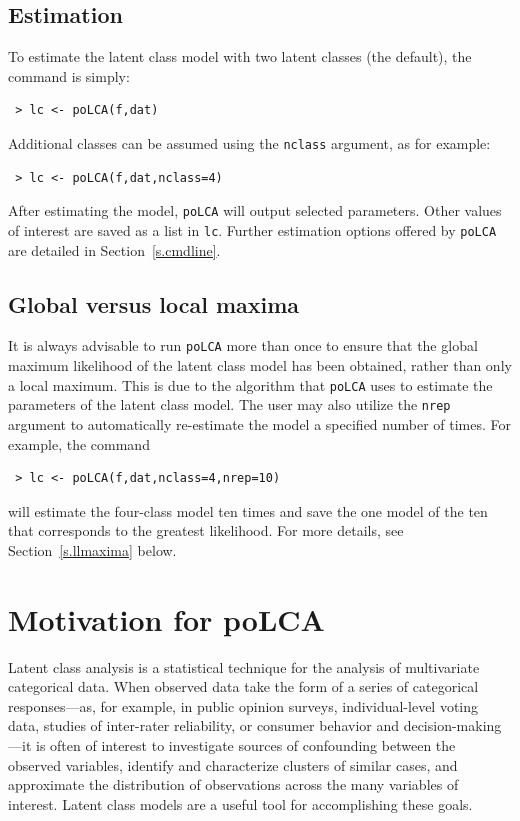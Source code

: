 \documentclass[letterpaper,12pt]{article}
\begin{document}
\subsection{Estimation}

To estimate the latent class model with two latent classes (the default), the command is simply:
\begin{verbatim}
 > lc <- poLCA(f,dat)
\end{verbatim}
Additional classes can be assumed using the \texttt{nclass} argument, as for example:
\begin{verbatim}
 > lc <- poLCA(f,dat,nclass=4)
\end{verbatim}
After estimating the model, \texttt{poLCA} will output selected parameters. Other values of interest are saved as a list in \texttt{lc}.  Further estimation options offered by \texttt{poLCA} are detailed in Section~\ref{s.cmdline}.

\subsection{Global versus local maxima}

It is always advisable to run \texttt{poLCA} more than once to ensure that the global maximum likelihood of the latent class model has been obtained, rather than only a local maximum. This is due to the algorithm that \texttt{poLCA} uses to estimate the parameters of the latent class model. The user may also utilize the \texttt{nrep} argument to automatically re-estimate the model a specified number of times.  For example, the command
\begin{verbatim}
 > lc <- poLCA(f,dat,nclass=4,nrep=10)
\end{verbatim}
will estimate the four-class model ten times and save the one model of the ten that corresponds to the greatest likelihood. For more details, see Section~\ref{s.llmaxima} below.


\section{Motivation for \textbf{poLCA}}

Latent class analysis is a statistical technique for the analysis of multivariate categorical data.  When observed data take the form of a series of categorical responses---as, for example, in public opinion surveys, individual-level voting data, studies of inter-rater reliability, or consumer behavior and decision-making---it is often of interest to investigate sources of confounding between the observed variables, identify and characterize clusters of similar cases, and approximate the distribution of observations across the many variables of interest. Latent class models are a useful tool for accomplishing these goals.
\end{document}
